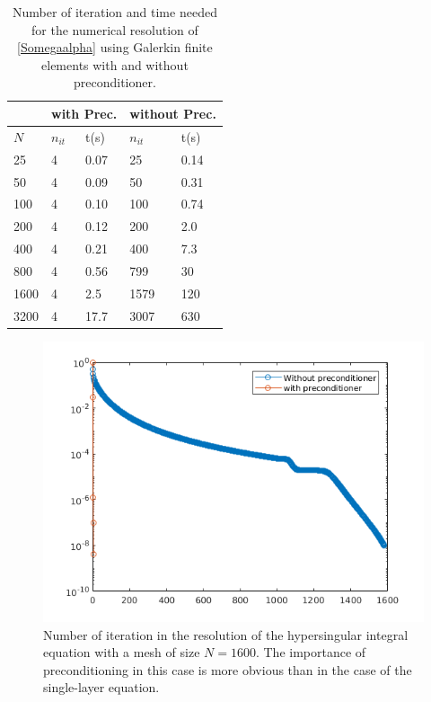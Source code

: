 \documentclass[a4paper]{article}
\begin{document}
			\begin{table}[H]
		\begin{center}
			\begin{tabular}{|| m{4em} | m{4em} | m{4em} | m{4em} | m{4em}||} 
				\hline
				\multicolumn{1}{||c|}{ }&
				\multicolumn{2}{c|}{with Prec.}&\multicolumn{2}{c||}{without Prec.}\\
				\hline
				$N$ & $n_{it}$& t(s) & $n_{it}$ & t(s)\\
				\hline\hline
				25 & 4 & 0.07 & 25 & 0.14\\ 
				\hline
				50 & 4 & 0.09 & 50 & 0.31\\
				\hline
				100 & 4 & 0.10 & 100 & 0.74\\
				\hline
				200 & 4 & 0.12 & 200 & 2.0\\
				\hline
				400 & 4 & 0.21 & 400 & 7.3\\
				\hline
				800 & 4 & 0.56 & 799 & 30 \\
				\hline
				1600 & 4 & 2.5 & 1579 & 120\\
				\hline
				3200 & 4 & 17.7 & 3007 & 630\\
				\hline
			\end{tabular}
		\end{center}
		\caption{Number of iteration and time needed for the numerical resolution of \eqref{Somegaalpha} using Galerkin finite elements with and without preconditioner.}
		\label{TableNitTimeLaplaceNeumann}
	\end{table}
	\begin{figure}[H]
		\centering
		\includegraphics[scale=0.7]{figs/PrecondNeumannLaplaceSeg.png}
		\caption{Number of iteration in the resolution of the hypersingular  integral equation with a mesh of size $N = 1600$. The importance of preconditioning in this case is more obvious than in the case of the single-layer equation.}
		\label{FigureNitLaplaceNeumann}
	\end{figure}
	
\end{document}
